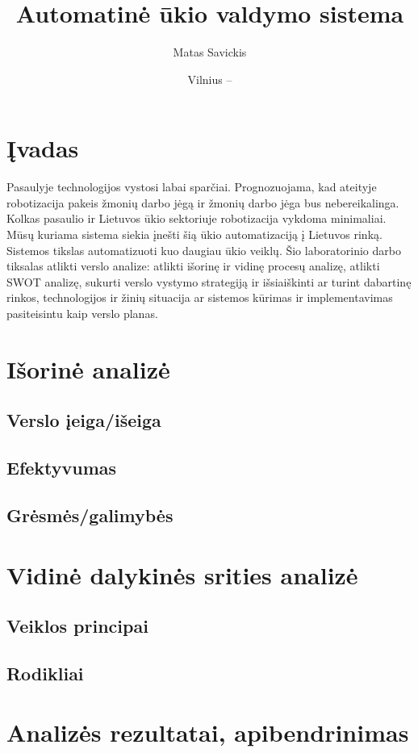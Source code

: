 \documentclass[oneside]{VUMIFPSkursinis}
\title{Automatinė ūkio valdymo sistema}
\author{Matas Savickis}
\date{Vilnius – \the\year}
\begin{document}
\maketitle
\centering
\tableofcontents


\section{Įvadas}
Pasaulyje technologijos vystosi labai sparčiai. Prognozuojama, kad ateityje robotizacija pakeis žmonių darbo jėgą ir žmonių darbo jėga bus nebereikalinga. Kolkas pasaulio ir Lietuvos ūkio sektoriuje robotizacija vykdoma minimaliai. Mūsų kuriama sistema siekia įnešti šią ūkio automatizaciją į Lietuvos rinką. Sistemos tikslas automatizuoti kuo daugiau ūkio veiklų. Šio laboratorinio darbo tiksalas atlikti verslo analize: atlikti išorinę ir vidinę procesų analizę, atlikti SWOT analizę, sukurti verslo vystymo strategiją ir išsiaiškinti ar turint dabartinę rinkos, technologijos ir žinių situacija ar sistemos kūrimas ir implementavimas pasiteisintu kaip verslo planas.

\section{Išorinė analizė}
	\subsection{Verslo įeiga/išeiga}
	\subsection{Efektyvumas}
	\subsection{Grėsmės/galimybės}
\section{Vidinė dalykinės srities analizė}
	\subsection{Veiklos principai}
	\subsection{Rodikliai}
\section{Analizės rezultatai, apibendrinimas}
\end{document}
